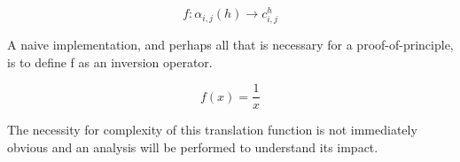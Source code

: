 \begin{equation}
f : \alpha_{i,j}(h) \to c_{i,j}^{h}
\end{equation}

A naive implementation, and perhaps all that is necessary for a
proof-of-principle, is to define f as an inversion operator.

\begin{equation}
f(x) = \frac{1}{x}
\end{equation}

The necessity for complexity of this translation function is not immediately
obvious and an analysis will be performed to understand its impact.
